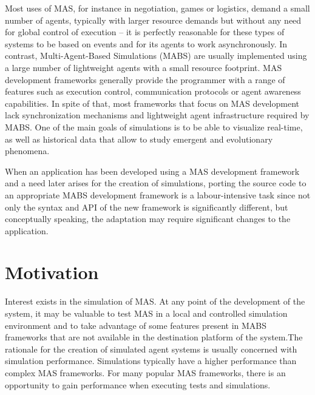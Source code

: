 Most uses of MAS, for instance in negotiation, games or logistics, demand a small number of agents, typically with larger resource demands but without any need for global control of execution -- it is perfectly reasonable for these types of systems to be based on events and for its agents to work asynchronously. In contrast, Multi-Agent-Based Simulations (MABS) are usually implemented using a large number of lightweight agents with a small resource footprint. MAS development frameworks generally provide the programmer with a range of features such as execution control, communication protocols or agent awareness capabilities. In spite of that, most frameworks that focus on MAS development lack synchronization mechanisms and lightweight agent infrastructure required by MABS. One of the main goals of simulations is to be able to visualize real-time, as well as historical data that allow to study emergent and evolutionary phenomena. \cite{mengistu2008scalability}

When an application has been developed using a MAS development framework and a need later arises for the creation of simulations, porting the source code to an appropriate MABS development framework is a labour-intensive task since not only the syntax and API of the new framework is significantly different, but conceptually speaking, the adaptation may require significant changes to the application.


\section{Motivation}
Interest exists in the simulation of MAS. At any point of the development of the system, it may be valuable to test MAS in a local and controlled simulation environment and to take advantage of some features present in MABS frameworks that are not available in the destination platform of the system.The rationale for the creation of simulated agent systems is usually concerned with simulation performance. Simulations typically have a higher performance than complex MAS frameworks. For many popular MAS frameworks, there is an opportunity to gain performance when executing tests and simulations. 

